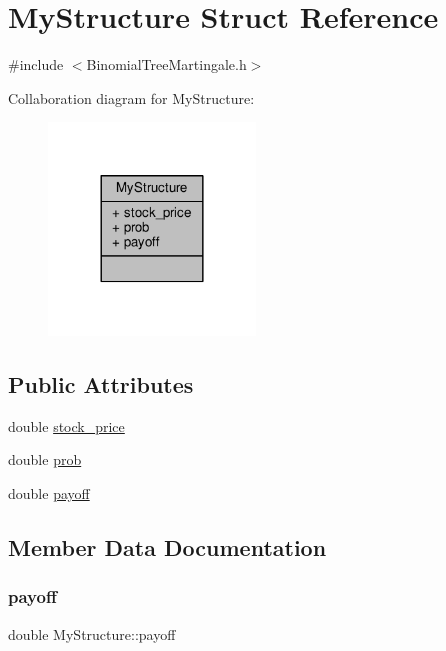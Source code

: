 \hypertarget{structMyStructure}{}\section{My\+Structure Struct Reference}
\label{structMyStructure}


{\ttfamily \#include $<$Binomial\+Tree\+Martingale.\+h$>$}



Collaboration diagram for My\+Structure\+:
\nopagebreak
\begin{figure}[H]
\begin{center}
\leavevmode
\includegraphics[width=156pt]{structMyStructure__coll__graph}
\end{center}
\end{figure}
\subsection*{Public Attributes}
\begin{DoxyCompactItemize}
\item 
double \hyperlink{structMyStructure_a584b01f4a2293b3e8fcb95578a81440f}{stock\+\_\+price}
\item 
double \hyperlink{structMyStructure_a113b8bdb72511c26fa67c641f0429968}{prob}
\item 
double \hyperlink{structMyStructure_a33adf562cea6b06c81870142c1656e55}{payoff}
\end{DoxyCompactItemize}


\subsection{Member Data Documentation}
\hypertarget{structMyStructure_a33adf562cea6b06c81870142c1656e55}{}\label{structMyStructure_a33adf562cea6b06c81870142c1656e55} 
\subsubsection{\texorpdfstring{payoff}{payoff}}
{\footnotesize\ttfamily double My\+Structure\+::payoff}

